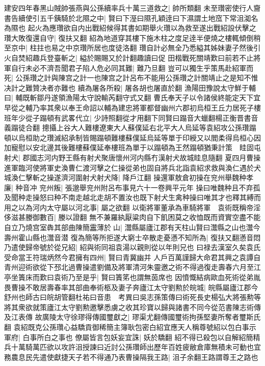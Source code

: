 建安四年春黑山賊帥張燕與公孫續率兵十萬三道救之|{
	帥所類翻}
未至瓚密使行人齎書告續使引五千銕騎於北隰之中|{
	賢曰下溼曰隰孔穎逹曰下濕謂土地窊下常沮洳名為隰也}
起火為應瓚欲自内出戰紹候得其書如期舉火瓚以為救至遂出戰紹設伏擊之瓚大敗復還自守|{
	復扶又翻}
紹為地道穿其樓下施木柱之度足逹半便燒之樓輒傾倒稍至京中|{
	柱拄也易之中京瓚所居也度徒洛翻}
瓚自計必無全乃悉縊其姊妹妻子然後引火自焚紹趣兵登臺斬之|{
	縊於賜賜又於計翻趣讀曰促}
田楷戰死關靖歎曰前若不止將軍自行未必不濟吾聞君子陷人危必同其難|{
	難乃旦翻}
豈可以獨生乎策馬赴紹軍而死|{
	公孫瓚之計與陳宫之計一也陳宫之計呂布不能用公孫瓚之計關靖止之是知不惟决計之難贊决者亦難也}
續為屠各所殺|{
	屠各胡也屠直於翻}
漁陽田豫說太守鮮于輔曰|{
	輔既斬鄒丹遂領漁陽太守說輸芮翻守式又翻}
曹氏奉天子以令諸侯終能定天下宜早從之輔乃率其衆以奉王命詔以輔為建忠將軍都督幽州六郡初烏桓王丘力居死子樓班年少從子蹋頓有武畧代立|{
	少詩照翻從才用翻下同賢曰蹋音大蠟翻楊正衡晋書音義蹋徒合翻}
摠攝上谷大人難樓遼東大人蘇僕延右北平大人烏延等袁紹攻公孫瓚蹋頓以烏桓助之瓚滅紹承制皆賜蹋頓難樓蘇僕延烏延等單于印綬又以閻柔得烏桓心因加寵慰以安北邊其後難樓蘇僕延奉樓班為單于以蹋頓為王然蹋頓猶秉計策　眭固屯射犬|{
	郡國志河内野王縣有射犬聚唐懷州河内縣冇漢射犬故城眭息隨翻}
夏四月曹操進軍臨河使將軍史渙曹仁渡河擊之仁操從弟也固自將兵北詣袁紹求救與渙仁遇於犬城渙仁擊斬之操遂濟河圍射犬射犬降|{
	降戶江翻}
操還軍敖倉初操在兖州舉魏种孝廉|{
	种音冲}
兖州叛|{
	張邈舉兖州附呂布事見六十一卷興平元年}
操曰唯魏种且不弃孤及聞种走操怒曰种不南走越北走胡不置汝也既下射犬生禽种操曰唯其才也釋其縛而用之以為河内太守屬以河北事|{
	屬之欲翻}
以衛將軍董承為車騎將軍　袁術既稱帝淫侈滋甚媵御數百|{
	媵以證翻}
無不兼羅紈厭粱肉自下飢困莫之收恤既而資實空盡不能自立乃燒宫室犇其部曲陳簡靁薄於山|{
	灊縣屬廬江郡有天柱山賢曰灊縣之山也灊今壽州霍山縣也灊音潜}
復為簡等所拒遂大窮士卒散走憂懣不知所為|{
	復扶又翻懣音悶}
乃遣使歸帝號於從兄紹|{
	紹與術同祖袁湯以親則從以年則兄也}
曰禄去漢室久矣袁氏受命當王符瑞炳然今君擁有四州|{
	賢曰青冀幽并}
人戶百萬謹歸大命君其興之袁譚自青州迎術欲從下邳北過曹操遣劉備及將軍清河朱靈邀之術不得過復走壽春六月至江亭坐簀床而歎曰袁術乃至是乎|{
	賢曰簀笫也謂無茵席也}
因憤慨結病歐血死術從弟胤畏曹操不敢居壽春率其部曲奉術柩及妻子奔廬江太守劉勲於皖城|{
	皖縣屬廬江郡今舒州也師古曰皖胡管翻杜祐曰音患　考異曰吳志孫策傳曰術死長史楊弘大將張勲等將其衆欲就策廬江太守劉勲邀擊悉虜之收其珍寶以歸與諸書不同今從范書陳志術傳及江表傳}
故廣陵太守徐璆得傳國璽獻之|{
	璆渠尤翻傳國璽術拘孫堅妻所奪者璽斯氏翻}
袁紹既克公孫瓚心益驕貢御稀簡主簿耿包密白紹宜應天人稱尊號紹以包白事示軍府|{
	白事所白之事也}
僚屬皆言包妖妄宜誅|{
	妖於驕翻}
紹不得已殺包以自解紹簡精兵十萬騎萬匹欲以攻許沮授諫曰近討公孫瓚師出歷年百姓疲敝倉庫無積未可動也宜務農息民先遣使獻捷天子若不得通乃表曹操隔我王路|{
	沮子余翻王路謂尊王之路也}
